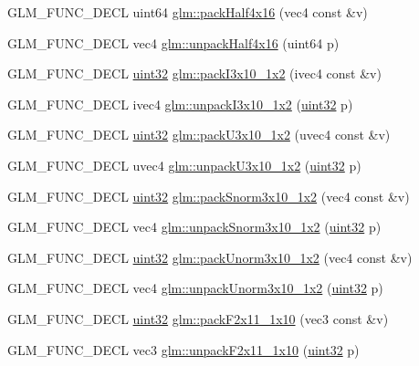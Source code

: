 \begin{DoxyCompactItemize}
G\+L\+M\+\_\+\+F\+U\+N\+C\+\_\+\+D\+E\+C\+L uint64 \hyperlink{group__gtc__packing_gafe2f7b39caf8f5ec555e1c059ec530e6}{glm\+::pack\+Half4x16} (vec4 const \&v)
\item 
G\+L\+M\+\_\+\+F\+U\+N\+C\+\_\+\+D\+E\+C\+L vec4 \hyperlink{group__gtc__packing_gaea526d6491ad40401eac34803984bf27}{glm\+::unpack\+Half4x16} (uint64 p)
\item 
G\+L\+M\+\_\+\+F\+U\+N\+C\+\_\+\+D\+E\+C\+L \hyperlink{stb__image_8c_a1134b580f8da4de94ca6b1de4d37975e}{uint32} \hyperlink{group__gtc__packing_ga032e18fa5bc5b8f3897104aeb2f1e195}{glm\+::pack\+I3x10\+\_\+1x2} (ivec4 const \&v)
\item 
G\+L\+M\+\_\+\+F\+U\+N\+C\+\_\+\+D\+E\+C\+L ivec4 \hyperlink{group__gtc__packing_ga08bcd34cf9c34701d658dd861ee6e300}{glm\+::unpack\+I3x10\+\_\+1x2} (\hyperlink{stb__image_8c_a1134b580f8da4de94ca6b1de4d37975e}{uint32} p)
\item 
G\+L\+M\+\_\+\+F\+U\+N\+C\+\_\+\+D\+E\+C\+L \hyperlink{stb__image_8c_a1134b580f8da4de94ca6b1de4d37975e}{uint32} \hyperlink{group__gtc__packing_gaf656d8862628f96b20de7a36eaa1fe56}{glm\+::pack\+U3x10\+\_\+1x2} (uvec4 const \&v)
\item 
G\+L\+M\+\_\+\+F\+U\+N\+C\+\_\+\+D\+E\+C\+L uvec4 \hyperlink{group__gtc__packing_ga119aa2d7d55952f9dc4214390a6ffefc}{glm\+::unpack\+U3x10\+\_\+1x2} (\hyperlink{stb__image_8c_a1134b580f8da4de94ca6b1de4d37975e}{uint32} p)
\item 
G\+L\+M\+\_\+\+F\+U\+N\+C\+\_\+\+D\+E\+C\+L \hyperlink{stb__image_8c_a1134b580f8da4de94ca6b1de4d37975e}{uint32} \hyperlink{group__gtc__packing_ga0d4157cec37c0312216a7be1cc92df54}{glm\+::pack\+Snorm3x10\+\_\+1x2} (vec4 const \&v)
\item 
G\+L\+M\+\_\+\+F\+U\+N\+C\+\_\+\+D\+E\+C\+L vec4 \hyperlink{group__gtc__packing_ga8b8bb827a3743ca553d8702d3e337101}{glm\+::unpack\+Snorm3x10\+\_\+1x2} (\hyperlink{stb__image_8c_a1134b580f8da4de94ca6b1de4d37975e}{uint32} p)
\item 
G\+L\+M\+\_\+\+F\+U\+N\+C\+\_\+\+D\+E\+C\+L \hyperlink{stb__image_8c_a1134b580f8da4de94ca6b1de4d37975e}{uint32} \hyperlink{group__gtc__packing_ga2cf2d11b40bd48639110456fd74c2e33}{glm\+::pack\+Unorm3x10\+\_\+1x2} (vec4 const \&v)
\item 
G\+L\+M\+\_\+\+F\+U\+N\+C\+\_\+\+D\+E\+C\+L vec4 \hyperlink{group__gtc__packing_gaf69ace2b5e9234f8afb4e99c3df1193d}{glm\+::unpack\+Unorm3x10\+\_\+1x2} (\hyperlink{stb__image_8c_a1134b580f8da4de94ca6b1de4d37975e}{uint32} p)
\item 
G\+L\+M\+\_\+\+F\+U\+N\+C\+\_\+\+D\+E\+C\+L \hyperlink{stb__image_8c_a1134b580f8da4de94ca6b1de4d37975e}{uint32} \hyperlink{group__gtc__packing_ga8c2a0eeee677ca4dafd9e093d9e81062}{glm\+::pack\+F2x11\+\_\+1x10} (vec3 const \&v)
\item 
G\+L\+M\+\_\+\+F\+U\+N\+C\+\_\+\+D\+E\+C\+L vec3 \hyperlink{group__gtc__packing_ga8b9c7991eb021d95c778bf5c0b2f7824}{glm\+::unpack\+F2x11\+\_\+1x10} (\hyperlink{stb__image_8c_a1134b580f8da4de94ca6b1de4d37975e}{uint32} p)
\end{DoxyCompactItemize}


